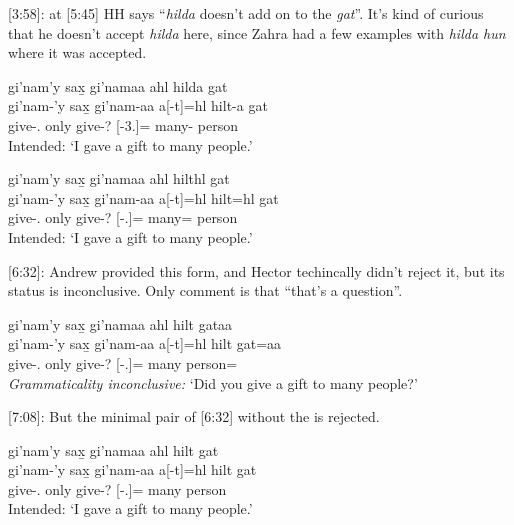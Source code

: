 [3:58]: at [5:45] HH says ``\textit{hilda} doesn't add on to the \textit{gat}''. It's kind of curious that he doesn't accept \textit{hilda} here, since Zahra had a few examples with \textit{hilda hun} where it was accepted.

\begin{exe}
    \ex 
    \begin{xlist}
    \item \glll * gi'nam'y sax̱ gi'namaa ahl hilda gat \\
    {} gi'nam-'y sax̱ gi'nam-aa a[-t]=hl hilt-a gat \\
    {} give-\Fsg{}.\Ii{} only give-\Nmlz{}? \Prep{}[-3.\Ii{}]=\Cn{} many-\Attr{} person \\
    Intended: `I gave a gift to many people.'
    \item \glll * gi'nam'y sax̱ gi'namaa ahl hilthl gat \\
    {} gi'nam-'y sax̱ gi'nam-aa a[-t]=hl hilt=hl gat \\
    {} give-\Fsg{}.\Ii{} only give-\Nmlz{}? \Prep{}[-\Ssg{}.\Ii{}]=\Cn{} many=\Cn{} person \\
    Intended: `I gave a gift to many people.'
    \end{xlist}
\end{exe}

[6:32]: Andrew provided this form, and Hector techincally didn't reject it, but its status is inconclusive. Only comment is that ``that's a question''.

\begin{exe}
    \ex \glll gi'nam'y sax̱ gi'namaa ahl hilt gataa \\
    gi'nam-'y sax̱ gi'nam-aa a[-t]=hl hilt gat=aa \\
    give-\Fsg{}.\Ii{} only give-\Nmlz{}? \Prep{}[-\Ssg{}.\Ii{}]=\Cn{} many person=\Q{} \\
    \textit{Grammaticality inconclusive: }`Did you give a gift to many people?'
\end{exe}

[7:08]: But the minimal pair of [6:32] without the \Q{} is rejected.

\begin{exe}
    \ex \glll * gi'nam'y sax̱ gi'namaa ahl hilt gat \\
    {} gi'nam-'y sax̱ gi'nam-aa a[-t]=hl hilt gat \\
    {} give-\Fsg{}.\Ii{} only give-\Nmlz{}? \Prep{}[-\Ssg{}.\Ii{}]=\Cn{} many person \\
    Intended: `I gave a gift to many people.'
\end{exe}

